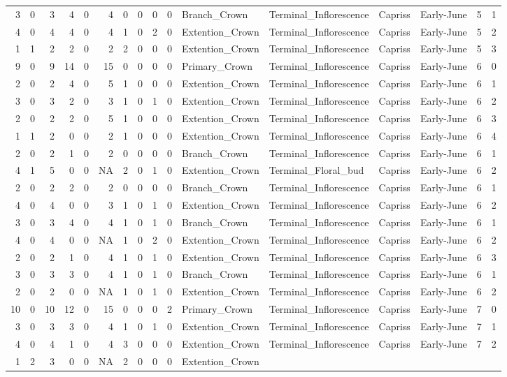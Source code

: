 \documentclass[]{article}
\begin{document}
\begin{longtable}[]{@{}rrrrrrrrrrllllrl@{}}
3 & 0 & 3 & 4 & 0 & 4 & 0 & 0 & 0 & 0 & Branch\_Crown &
Terminal\_Inflorescence & Capriss & Early-June & 5 & 1\tabularnewline
4 & 0 & 4 & 4 & 0 & 4 & 1 & 0 & 2 & 0 & Extention\_Crown &
Terminal\_Inflorescence & Capriss & Early-June & 5 & 2\tabularnewline
1 & 1 & 2 & 2 & 0 & 2 & 2 & 0 & 0 & 0 & Extention\_Crown &
Terminal\_Inflorescence & Capriss & Early-June & 5 & 3\tabularnewline
9 & 0 & 9 & 14 & 0 & 15 & 0 & 0 & 0 & 0 & Primary\_Crown &
Terminal\_Inflorescence & Capriss & Early-June & 6 & 0\tabularnewline
2 & 0 & 2 & 4 & 0 & 5 & 1 & 0 & 0 & 0 & Extention\_Crown &
Terminal\_Inflorescence & Capriss & Early-June & 6 & 1\tabularnewline
3 & 0 & 3 & 2 & 0 & 3 & 1 & 0 & 1 & 0 & Extention\_Crown &
Terminal\_Inflorescence & Capriss & Early-June & 6 & 2\tabularnewline
2 & 0 & 2 & 2 & 0 & 5 & 1 & 0 & 0 & 0 & Extention\_Crown &
Terminal\_Inflorescence & Capriss & Early-June & 6 & 3\tabularnewline
1 & 1 & 2 & 0 & 0 & 2 & 1 & 0 & 0 & 0 & Extention\_Crown &
Terminal\_Inflorescence & Capriss & Early-June & 6 & 4\tabularnewline
2 & 0 & 2 & 1 & 0 & 2 & 0 & 0 & 0 & 0 & Branch\_Crown &
Terminal\_Inflorescence & Capriss & Early-June & 6 & 1\tabularnewline
4 & 1 & 5 & 0 & 0 & NA & 2 & 0 & 1 & 0 & Extention\_Crown &
Terminal\_Floral\_bud & Capriss & Early-June & 6 & 2\tabularnewline
2 & 0 & 2 & 2 & 0 & 2 & 0 & 0 & 0 & 0 & Branch\_Crown &
Terminal\_Inflorescence & Capriss & Early-June & 6 & 1\tabularnewline
4 & 0 & 4 & 0 & 0 & 3 & 1 & 0 & 1 & 0 & Extention\_Crown &
Terminal\_Inflorescence & Capriss & Early-June & 6 & 2\tabularnewline
3 & 0 & 3 & 4 & 0 & 4 & 1 & 0 & 1 & 0 & Branch\_Crown &
Terminal\_Inflorescence & Capriss & Early-June & 6 & 1\tabularnewline
4 & 0 & 4 & 0 & 0 & NA & 1 & 0 & 2 & 0 & Extention\_Crown &
Terminal\_Inflorescence & Capriss & Early-June & 6 & 2\tabularnewline
2 & 0 & 2 & 1 & 0 & 4 & 1 & 0 & 1 & 0 & Extention\_Crown &
Terminal\_Inflorescence & Capriss & Early-June & 6 & 3\tabularnewline
3 & 0 & 3 & 3 & 0 & 4 & 1 & 0 & 1 & 0 & Branch\_Crown &
Terminal\_Inflorescence & Capriss & Early-June & 6 & 1\tabularnewline
2 & 0 & 2 & 0 & 0 & NA & 1 & 0 & 1 & 0 & Extention\_Crown &
Terminal\_Inflorescence & Capriss & Early-June & 6 & 2\tabularnewline
10 & 0 & 10 & 12 & 0 & 15 & 0 & 0 & 0 & 2 & Primary\_Crown &
Terminal\_Inflorescence & Capriss & Early-June & 7 & 0\tabularnewline
3 & 0 & 3 & 3 & 0 & 4 & 1 & 0 & 1 & 0 & Extention\_Crown &
Terminal\_Inflorescence & Capriss & Early-June & 7 & 1\tabularnewline
4 & 0 & 4 & 1 & 0 & 4 & 3 & 0 & 0 & 0 & Extention\_Crown &
Terminal\_Inflorescence & Capriss & Early-June & 7 & 2\tabularnewline
1 & 2 & 3 & 0 & 0 & NA & 2 & 0 & 0 & 0 & Extention\_Crown &

\end{longtable}
\end{document}
